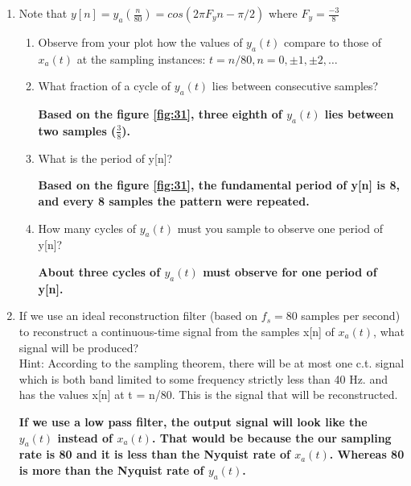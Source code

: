 \documentclass[12pt]{article}
\begin{document}
\begin{enumerate}
\begin{enumerate}
\item Note that $y[n] = y_a(\frac{n}{80}) = cos(2\pi F_y n-\pi/2)$ where $F_y = \frac{-3}{8}$
\begin{enumerate}

\item Observe from your plot how the values of $y_a(t)$ compare to those of $x_a(t)$ at the sampling instances: $t = n/80, n = 0, \pm 1, \pm 2, \hdots$
\item What fraction of a cycle of $y_a(t)$ lies between consecutive samples?

\textbf{Based on the figure \ref{fig:31}, three eighth of $y_a(t)$ lies between two samples ($\frac{3}{8}$).}

\item What is the period of y[n]?

\textbf{Based on the figure \ref{fig:31}, the fundamental period of y[n] is 8, and every 8 samples the pattern were repeated.}

\item How many cycles of $y_a(t)$ must you sample to observe one period of y[n]?

\textbf{About three cycles of $y_a(t)$ must observe for one period of y[n].}

\end{enumerate}













\item If we use an ideal reconstruction filter (based on $f_s=80$ samples per second) to reconstruct a continuous-time signal from the samples x[n] of $x_a(t)$, what signal will be produced? \\
Hint: According to the sampling theorem, there will be at most one c.t. signal which is both band limited to some frequency strictly less than 40 Hz. and has the values
x[n] at t = n/80. This is the signal that will be reconstructed.

\textbf{If we use a low pass filter, the output signal will look like the $y_a(t)$ instead of $x_a(t)$. That would be because the our sampling rate is 80 and it is less than the Nyquist rate of $x_a(t)$. Whereas 80 is more than the Nyquist rate of $y_a(t)$.}


\end{enumerate}
\end{enumerate}
\end{document}
